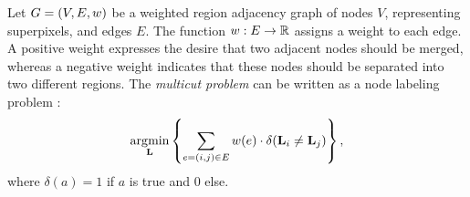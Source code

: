Let $G=(V,E, w)$ be a weighted region adjacency graph of
nodes $V$, representing superpixels,
and edges $E$.
%
The function $w : E \rightarrow \mathbb{R}$ assigns a weight to each edge.
A positive weight expresses the desire that two adjacent nodes should
be merged, whereas a negative weight indicates
that these nodes should be separated into two different regions.
The \emph{multicut problem} can be written as a node labeling problem
\cite{bagon_2011_arxiv}:
%
\begin{align}
\operatorname*{\arg\!\min}_{\mathbf{L}}
    \left\{
    \sum_{ e=(i,j) \in E}
        w(e)
        \cdot \delta( \mathbf{L}_i \neq \mathbf{L}_j )
    \right\},
    \label{eq:multicut_primal_a}
\end{align}
%
where $\delta(a) = 1$ if $a$ is true and $0$ else.





